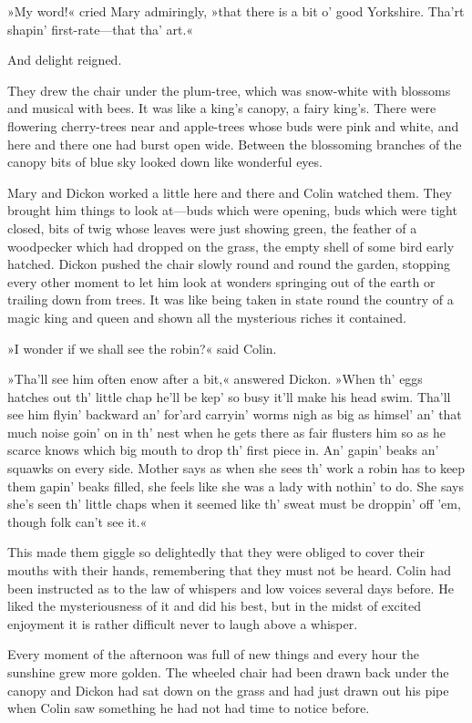»My word!« cried Mary admiringly, »that there is a bit o' good Yorkshire. Tha'rt shapin' first-rate—that tha' art.«

And delight reigned.

They drew the chair under the plum-tree, which was snow-white with blossoms and musical with bees. It was like a king's canopy, a fairy king's. There were flowering cherry-trees near and apple-trees whose buds were pink and white, and here and there one had burst open wide. Between the blossoming branches of the canopy bits of blue sky looked down like wonderful eyes.

Mary and Dickon worked a little here and there and Colin watched them. They brought him things to look at—buds which were opening, buds which were tight closed, bits of twig whose leaves were just showing green, the feather of a woodpecker which had dropped on the grass, the empty shell of some bird early hatched. Dickon pushed the chair slowly round and round the garden, stopping every other moment to let him look at wonders springing out of the earth or trailing down from trees. It was like being taken in state round the country of a magic king and queen and shown all the mysterious riches it contained.

»I wonder if we shall see the robin?« said Colin.

»Tha'll see him often enow after a bit,« answered Dickon. »When th' eggs hatches out th' little chap he'll be kep' so busy it'll make his head swim. Tha'll see him flyin' backward an' for'ard carryin' worms nigh as big as himsel' an' that much noise goin' on in th' nest when he gets there as fair flusters him so as he scarce knows which big mouth to drop th' first piece in. An' gapin' beaks an' squawks on every side. Mother says as when she sees th' work a robin has to keep them gapin' beaks filled, she feels like she was a lady with nothin' to do. She says she's seen th' little chaps when it seemed like th' sweat must be droppin' off 'em, though folk can't see it.«

This made them giggle so delightedly that they were obliged to cover their mouths with their hands, remembering that they must not be heard. Colin had been instructed as to the law of whispers and low voices several days before. He liked the mysteriousness of it and did his best, but in the midst of excited enjoyment it is rather difficult never to laugh above a whisper.

Every moment of the afternoon was full of new things and every hour the sunshine grew more golden. The wheeled chair had been drawn back under the canopy and Dickon had sat down on the grass and had just drawn out his pipe when Colin saw something he had not had time to notice before.

